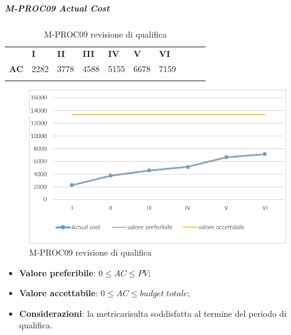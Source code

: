 \subparagraph{M-PROC09 Actual Cost} \mbox{}
\begin{longtable}[H!] {						
		>{}p{50mm}  		
		>{}p{8mm}
		>{}p{8mm}		
		>{}p{8mm}		
		>{}p{8mm}		
		>{}p{8mm}		
		>{}p{8mm}
		>{}p{8mm}
		>{}p{8mm}
		>{}p{8mm}
	}
	\rowcolor{gray!50}
	\textbf{} & \textbf{I} & \textbf{II} & \textbf{III} & \textbf{IV} & \textbf{V} & \textbf{VI} \TBstrut \\ [2mm]
	\textbf{AC} & 2282 & 3778 & 4588 & 5155 & 6678 & 7159 \TBstrut \\ [2mm]
	\rowcolor{white}
	\caption{M-PROC09 revisione di qualifica}
\end{longtable}
\begin{figure}[H] 	
	\includegraphics[width=\linewidth]{./img/grafici/RQ9.png}	
	\caption{M-PROC09 revisione di qualifica}	
\end{figure}
\begin{itemize}
	\item \textbf{Valore preferibile}: $0\le AC \le PV$;
	\item \textbf{Valore accettabile}: $0 \le AC \le budget \; totale$;
	\item \textbf{Considerazioni}: la metrica\glosp risulta soddisfatta al termine del periodo di qualifica.
\end{itemize}

